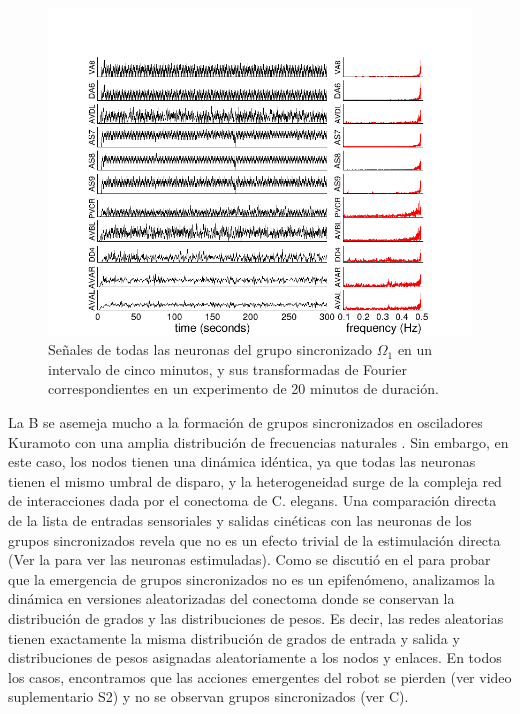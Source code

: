  \begin{figure}[h!]
	\centering\includegraphics[width=\imsize]{cluster_3.png}
	\caption[ Señales de todas las neuronas del grupo sincronizado $\Omega_3$ en un intervalo de cinco minutos, y sus transformadas de Fourier correspondientes en un experimento de 20 minutos de duración.]{Señales de todas las neuronas del grupo sincronizado $\Omega_1$ en un intervalo de cinco minutos, y sus transformadas de Fourier correspondientes en un experimento de 20 minutos de duración.}\label{fig:cluster_3}
\end{figure}

La B se asemeja mucho a la formación de grupos sincronizados en osciladores Kuramoto con una amplia distribución de frecuencias naturales \cite{manrubia_emergence_2004}.  Sin embargo, en este caso, los nodos tienen una dinámica idéntica, ya que todas las neuronas tienen el mismo umbral de disparo, y la heterogeneidad surge de la compleja red de interacciones dada por el conectoma de C. elegans. Una comparación directa de la lista de entradas sensoriales y salidas cinéticas con las neuronas de los grupos sincronizados revela que no es un efecto trivial de la estimulación directa (Ver la  para ver las neuronas estimuladas).  Como se discutió en el  para probar que la emergencia de grupos sincronizados no es un epifenómeno, analizamos la dinámica en versiones aleatorizadas del conectoma donde se conservan la distribución de grados y las distribuciones de pesos. Es decir, las redes aleatorias tienen exactamente la misma distribución de grados de entrada y salida y distribuciones de pesos asignadas aleatoriamente a los nodos y enlaces. En todos los casos, encontramos que las acciones emergentes del robot se pierden (ver video suplementario S2) y no se observan grupos sincronizados (ver C).

